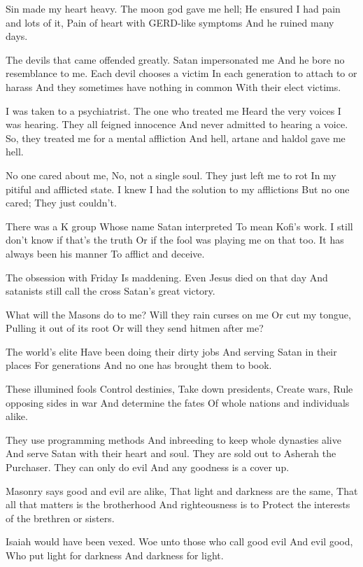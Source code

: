 \documentclass[
]{book}
\begin{document}
Sin made my heart heavy.
The moon god gave me hell;
He ensured I had pain and lots of it,
Pain of heart with GERD-like symptoms
And he ruined many days.

The devils that came offended greatly.
Satan impersonated me
And he bore no resemblance to me.
Each devil chooses a victim
In each generation to attach to or harass
And they sometimes have nothing in common
With their elect victims.

I was taken to a psychiatrist.
The one who treated me
Heard the very voices I was hearing.
They all feigned innocence
And never admitted to hearing a voice.
So, they treated me for a mental affliction
And hell, artane and haldol gave me hell.

No one cared about me,
No, not a single soul.
They just left me to rot
In my pitiful and afflicted state.
I knew I had the solution to my afflictions
But no one cared;
They just couldn't.

There was a K group
Whose name Satan interpreted
To mean Kofi's work.
I still don't know if that's the truth
Or if the fool was playing me on that too.
It has always been his manner
To afflict and deceive.

The obsession with Friday
Is maddening.
Even Jesus died on that day
And satanists still call the cross
Satan's great victory.

What will the Masons do to me?
Will they rain curses on me
Or cut my tongue,
Pulling it out of its root
Or will they send hitmen after me?

The world's elite
Have been doing their dirty jobs
And serving Satan in their places
For generations
And no one has brought them to book.

These illumined fools
Control destinies,
Take down presidents,
Create wars,
Rule opposing sides in war
And determine the fates
Of whole nations and individuals alike.

They use programming methods
And inbreeding to keep whole dynasties alive
And serve Satan with their heart and soul.
They are sold out to Asherah the Purchaser.
They can only do evil
And any goodness is a cover up.

Masonry says good and evil are alike,
That light and darkness are the same,
That all that matters is the brotherhood
And righteousness is to
Protect the interests of the brethren or sisters.

Isaiah would have been vexed.
Woe unto those who call good evil
And evil good,
Who put light for darkness
And darkness for light.
\end{document}
